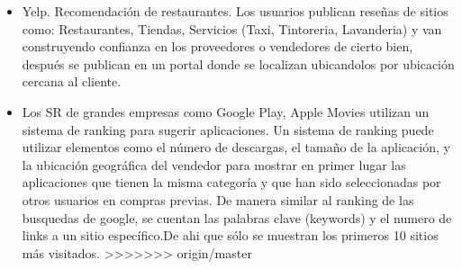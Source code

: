 \begin{itemize}
\item Yelp. Recomendación de restaurantes. Los usuarios publican reseñas de sitios como: Restaurantes, Tiendas, Servicios (Taxi, Tintoreria, Lavanderia) y van construyendo confianza en los proveedores o vendedores de cierto bien, después se publican en un portal donde se localizan ubicandolos por ubicación cercana al cliente.

\item Los SR de grandes empresas como
Google Play, Apple Movies  utilizan un sistema de ranking para sugerir aplicaciones. Un sistema de ranking puede utilizar elementos como el número de descargas, el tamaño de la aplicación, y la ubicación geográfica del vendedor para mostrar en primer lugar las aplicaciones que tienen la misma categoría y que han sido seleccionadas por otros usuarios en compras previas. De manera similar al ranking de las busquedas de google,  se cuentan las palabras clave (keywords) y el numero de links a un sitio específico.De ahi que sólo se muestran los primeros 10 sitios más visitados. 
>>>>>>> origin/master
\end{itemize}
